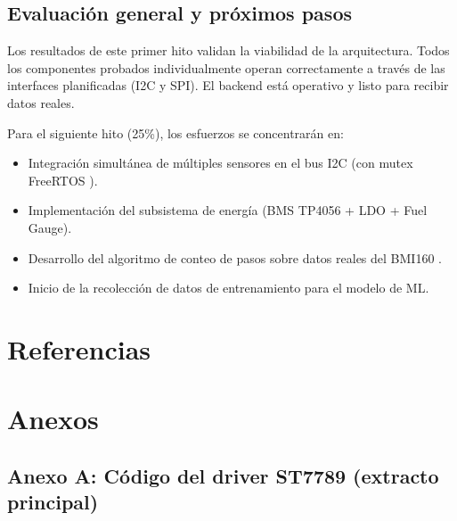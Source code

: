\documentclass[letterpaper,11pt]{article}
\begin{document}
\subsection{Evaluación general y próximos pasos}

Los resultados de este primer hito validan la viabilidad de la arquitectura. Todos los componentes probados individualmente operan correctamente a través de las interfaces planificadas (I2C y SPI). El backend está operativo y listo para recibir datos reales.

Para el siguiente hito (25\%), los esfuerzos se concentrarán en:
\begin{itemize}
    \item Integración simultánea de múltiples sensores en el bus I2C (con mutex FreeRTOS \citep{freertos_ref}).
    \item Implementación del subsistema de energía (BMS TP4056 \citep{tp4056_ds} + LDO + Fuel Gauge).
    \item Desarrollo del algoritmo de conteo de pasos sobre datos reales del BMI160 \citep{bmi160_ds}.
    \item Inicio de la recolección de datos de entrenamiento para el modelo de ML.
\end{itemize}

\section{Referencias}




\section{Anexos}

\subsection{Anexo A: Código del driver ST7789 (extracto principal)}
\end{document}
